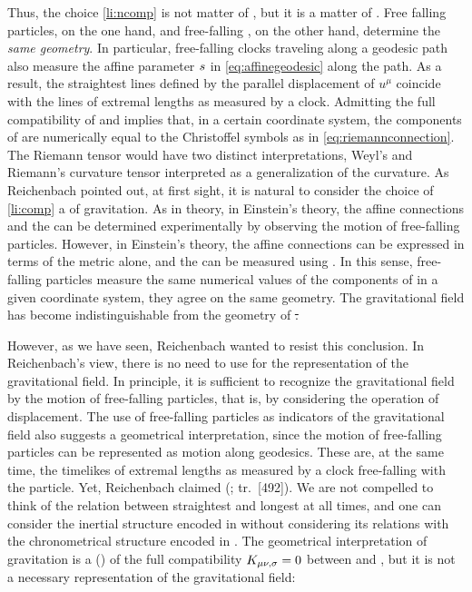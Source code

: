 \documentclass[final]{article}
\newcommand{\til}{timelike\xspace}
\renewcommand{\rzlap}[2]{(\cite[#1]{Reichenbach1928}; tr.\ [#2])\xspace}
\begin{document}

Thus, the choice \cref{li:ncomp} is not matter of , but it is a matter of  \citep[see][\S2]{Reichenbach1924}. Free falling particles, on the one hand, and free-falling \rac, on the other hand, determine the \emph{same geometry}. In particular, free-falling clocks traveling along a geodesic path also measure the affine parameter $s$ in \cref{eq:affinegeodesic} along the path. As a result, the straightest lines defined by the parallel displacement of $u^\mu$ coincide with the lines of extremal lengths as measured by a clock. Admitting the full compatibility of \gmn and \Gtmn implies that, in a certain coordinate system, the components of \Gtmn are numerically equal to the Christoffel symbols as in \cref{eq:riemannconnection}. The Riemann tensor would have two distinct interpretations, Weyl's  \ritea and Riemann's curvature tensor \riteg interpreted as a generalization of the  curvature. As Reichenbach pointed out, at first sight, it is natural to consider the choice of \cref{li:comp} a  of gravitation. As in  theory, in Einstein's theory, the affine connections and the \ritea can be determined experimentally by observing the motion of free-falling particles. However, in Einstein's theory, the affine connections \Gtmn can be expressed in terms of the metric \gmn alone, and the \riteg can be measured using \rac. In this sense, free-falling particles measure the same numerical values of the components of \rite in a given coordinate system, \ie they agree on the same geometry. The gravitational field has become indistinguishable from the geometry of \st.

However, as we have seen, Reichenbach wanted to resist this conclusion. In Reichenbach's view, there is no need to use \rac for the representation of the gravitational field. In principle, it is sufficient to recognize the gravitational field by the motion of free-falling particles, that is, by considering the operation of displacement. The use of free-falling particles as indicators of the gravitational field also suggests a geometrical interpretation, since the motion of free-falling particles can be represented as motion along geodesics. These are, at the same time, the \til \wl{}s of extremal lengths as measured by a clock free-falling with the particle. Yet, Reichenbach claimed  \rzlap{353}{492}. We are not compelled to think of the relation between straightest and longest \wl{} at all times, and one can consider the inertial structure encoded in \Gtmn without considering its relations with the chronometrical structure encoded in \gmn. The geometrical interpretation of gravitation is a  () of the full compatibility $K_{\mu \nu, \sigma}=0$ between \gmn and \Gtmn, but it is not a necessary representation of the gravitational field:
\end{document}
